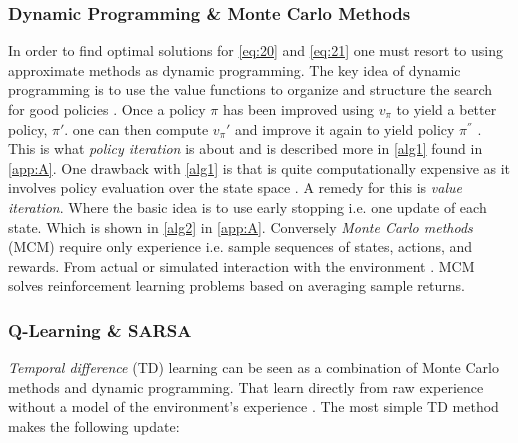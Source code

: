 \documentclass{kththesis}
\theoremstyle{definition}
\begin{document}
\subsubsection*{Dynamic Programming \& Monte Carlo Methods}
In order to find optimal solutions for \autoref{eq:20} and \autoref{eq:21} one must resort to using approximate methods as dynamic programming. The key idea of dynamic programming is to use the value functions to organize and structure the search for good policies \parencite{sutton1998reinforcement, szepesvari2009algorithms}. Once a policy $\pi$ has been improved using $v_{\pi}$ to yield a better policy,  $\pi'$. one can then compute $v_{\pi}'$ and improve it again to yield policy $\pi^{''}$ \parencite{sutton1998reinforcement}. This is what \textit{policy iteration} is about and is described more in \autoref{alg1} found in \autoref{app:A}.
\newline
\newline
One drawback with \autoref{alg1} is that is quite computationally expensive as it involves policy evaluation over the state space \parencite{sutton1998reinforcement}. A remedy for this is \textit{value iteration}. Where the basic idea is to use early stopping i.e. one update of each state. Which is shown in \autoref{alg2} in \autoref{app:A}. Conversely \textit{Monte Carlo methods} (MCM) require only experience i.e. sample sequences of states, actions, and rewards. From actual or simulated interaction with the environment \parencite{sutton1998reinforcement}. MCM solves reinforcement learning problems based on averaging sample returns. 


\subsubsection*{Q-Learning \& SARSA}
\textit{Temporal difference} (TD) learning can be seen as a combination of Monte Carlo methods and dynamic programming. That learn directly from raw experience without a model of the environment's experience \parencite{sutton1998reinforcement, arulkumaran2017brief}. The most simple TD method makes the following update:
\end{document}
